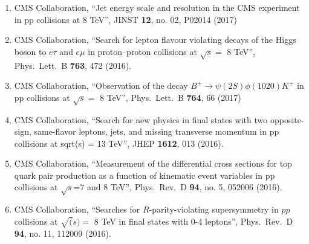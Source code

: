 \begin{enumerate}
\item CMS Collaboration, ``Jet energy scale and resolution in the CMS experiment in pp collisions at 8 TeV'', JINST {\bf 12}, no. 02, P02014 (2017)

\item CMS Collaboration, ``Search for lepton flavour violating decays of the Higgs boson to $e \tau$ and $e \mu$ in proton–proton collisions at $\sqrt s=$ 8 TeV'', Phys.\ Lett.\ B {\bf 763}, 472 (2016).

\item CMS Collaboration, ``Observation of the decay $B^+ \to \psi(2S) \phi(1020) K^+$ in pp collisions at $\sqrt s =$ 8 TeV'', Phys.\ Lett.\ B {\bf 764}, 66 (2017)

\item CMS Collaboration, ``Search for new physics in final states with two opposite-sign, same-flavor leptons, jets, and missing transverse momentum in pp collisions at sqrt(s) = 13 TeV'', JHEP {\bf 1612}, 013 (2016).

\item CMS Collaboration, ``Measurement of the differential cross sections for top quark pair production as a function of kinematic event variables in pp collisions at $\sqrt s$=7 and 8 TeV'', Phys.\ Rev.\ D {\bf 94}, no. 5, 052006 (2016).

\item CMS Collaboration, ``Searches for $R$-parity-violating supersymmetry in $pp $collisions at $\sqrt(s) =$ 8 TeV in final states with 0-4 leptons'', Phys.\ Rev.\ D {\bf 94}, no. 11, 112009 (2016).


\end{enumerate}
